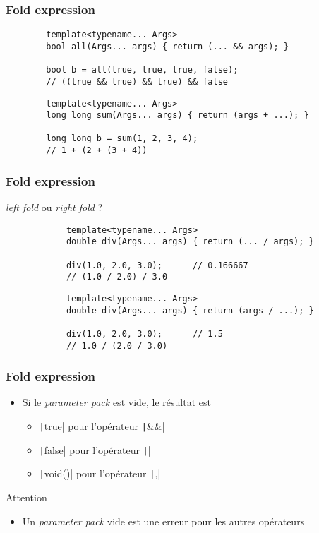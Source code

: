 \documentclass[C++.tex]{subfiles}
\begin{document}
\begin{frame}[fragile]
	\frametitle{Fold expression}
	\begin{verbatim}
		template<typename... Args>
		bool all(Args... args) { return (... && args); }

		bool b = all(true, true, true, false);
		// ((true && true) && true) && false
	\end{verbatim}

	\begin{verbatim}
		template<typename... Args>
		long long sum(Args... args) { return (args + ...); }

		long long b = sum(1, 2, 3, 4);
		// 1 + (2 + (3 + 4))
	\end{verbatim}

\end{frame}

\begin{frame}[fragile]
	\frametitle{Fold expression}
	\begin{alertblock}{\textit{left fold} ou \textit{right fold} ?}
		\begin{verbatim}
			template<typename... Args>
			double div(Args... args) { return (... / args); }

			div(1.0, 2.0, 3.0);      // 0.166667
			// (1.0 / 2.0) / 3.0
		\end{verbatim}

		\begin{verbatim}
			template<typename... Args>
			double div(Args... args) { return (args / ...); }

			div(1.0, 2.0, 3.0);      // 1.5
			// 1.0 / (2.0 / 3.0)
		\end{verbatim}
	\end{alertblock}

\end{frame}

\begin{frame}[fragile]
	\frametitle{Fold expression}
	\begin{itemize}
		\item Si le \textit{parameter pack} est vide, le résultat est
		\begin{itemize}
			\item \texttt|true| pour l'opérateur \texttt|&&|
			\item \texttt|false| pour l'opérateur \texttt||||
			\item \texttt|void()| pour l'opérateur \texttt|,|
		\end{itemize}
	\end{itemize}

	\begin{alertblock}{Attention}
		\begin{itemize}
			\item Un \textit{parameter pack} vide est une erreur pour les autres opérateurs
		\end{itemize}
	\end{alertblock}

\end{frame}
\end{document}

